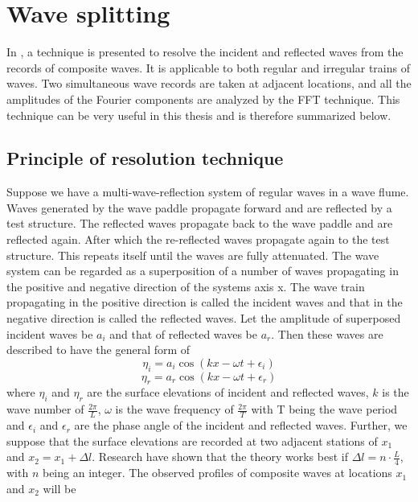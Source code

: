 \chapter{Wave splitting}
\label{app: wave splitting}


In \parencite{Goda1976}, a technique is presented to resolve the incident and reflected waves from the records of composite waves. It is applicable to both regular and irregular trains of waves. Two simultaneous wave records are taken at adjacent locations, and all the amplitudes of the Fourier components are analyzed by the FFT technique. This technique can be very useful in this thesis and is therefore summarized below.

\section{Principle of resolution technique}
Suppose we have a multi-wave-reflection system of regular waves in a wave flume. Waves generated by the wave paddle propagate forward and are reflected by a test structure. The reflected waves propagate back to the wave paddle and are reflected again. After which the re-reflected waves propagate again to the test structure. This repeats itself until the waves are fully attenuated. The wave system can be regarded as a superposition of a number of waves propagating in the positive and negative direction of the systems axis x. The wave train propagating in the positive direction is called the incident waves and that in the negative direction is called the reflected waves. Let the amplitude of superposed incident waves be $a_i$ and that of reflected waves be $a_r$. Then these waves are described to have the general form of 
\begin{equation}
    \eta_i = a_i \cos(kx- \omega t + \epsilon_i)
\end{equation}
\begin{equation}
    \eta_r = a_r \cos(kx- \omega t + \epsilon_r)
\end{equation}
where $\eta_i$ and $\eta_r$ are the surface elevations of incident and reflected waves, $k$ is the wave number of $\frac{2\pi}{L}$, $\omega$ is the wave frequency of $\frac{2\pi}{T}$ with T being the wave period and $\epsilon_i$ and $\epsilon_r$ are the phase angle of the incident and reflected waves. Further, we suppose that the surface elevations are recorded at two adjacent stations of $x_1$ and $x_2=x_1+\Delta l$. Research have shown that the theory works best if $\Delta l = n \cdot \frac{L}{4}$, with $n$ being an integer. The observed profiles of composite waves at locations $x_1$ and $x_2$ will be 
